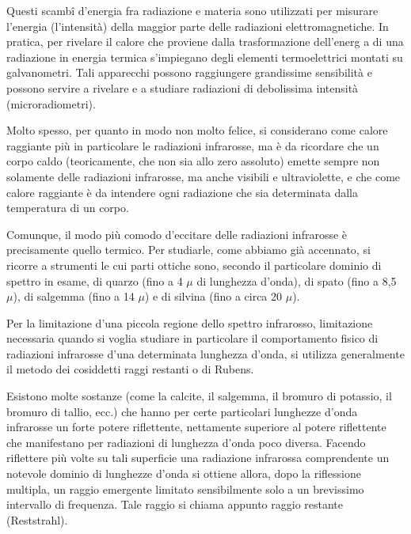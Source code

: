 \documentclass[a4paper]{article}
\begin{document}
Questi scambî d'energia fra radiazione e materia sono utilizzati per misurare l'energia (l'intensità) della maggior parte delle radiazioni elettromagnetiche. In pratica, per rivelare il calore che proviene dalla trasformazione dell'energ a di una radiazione in energia termica s'impiegano degli elementi termoelettrici montati su galvanometri. Tali apparecchi possono raggiungere grandissime sensibilità e possono servire a rivelare e a studiare radiazioni di debolissima intensità (microradiometri).

Molto spesso, per quanto in modo non molto felice, si considerano come calore raggiante più in particolare le radiazioni infrarosse, ma è da ricordare che un corpo caldo (teoricamente, che non sia allo zero assoluto) emette sempre non solamente delle radiazioni infrarosse, ma anche visibili e ultraviolette, e che come calore raggiante è da intendere ogni radiazione che sia determinata dalla temperatura di un corpo.

Comunque, il modo più comodo d'eccitare delle radiazioni infrarosse è precisamente quello termico. Per studiarle, come abbiamo già accennato, si ricorre a strumenti le cui parti ottiche sono, secondo il particolare dominio di spettro in esame, di quarzo (fino a 4 $\mu$ di lunghezza d'onda), di spato (fino a 8,5 $\mu$), di salgemma (fino a 14 $\mu$) e di silvina (fino a circa 20 $\mu$).

Per la limitazione d'una piccola regione dello spettro infrarosso, limitazione necessaria quando si voglia studiare in particolare il comportamento fisico di radiazioni infrarosse d'una determinata lunghezza d'onda, si utilizza generalmente il metodo dei cosiddetti raggi restanti o di Rubens.

Esistono molte sostanze (come la calcite, il salgemma, il bromuro di potassio, il bromuro di tallio, ecc.) che hanno per certe particolari lunghezze d'onda infrarosse un forte potere riflettente, nettamente superiore al potere riflettente che manifestano per radiazioni di lunghezza d'onda poco diversa. Facendo riflettere più volte su tali superficie una radiazione infrarossa comprendente un notevole dominio di lunghezze d'onda si ottiene allora, dopo la riflessione multipla, un raggio emergente limitato sensibilmente solo a un brevissimo intervallo di frequenza. Tale raggio si chiama appunto raggio restante (Reststrahl).
\end{document}
